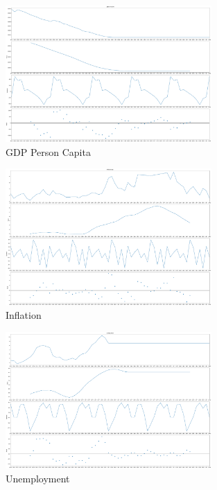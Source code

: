 \begin{figure}[H]
    \centering
    \includegraphics[width=0.7\textwidth]{Images/gdp-p-capita_decompose.pdf}
    \caption{GDP Person Capita}
    \label{fig1}
\end{figure}


\begin{figure}[H]
    \centering
    \includegraphics[width=0.7\textwidth]{Images/inflation-cpi_decompose.pdf}
    \caption{Inflation}
    \label{fig1}
\end{figure}


\begin{figure}[H]
    \centering
    \includegraphics[width=0.7\textwidth]{Images/unemp-total_decompose.pdf}
    \caption{Unemployment}
    \label{fig1}
\end{figure}

